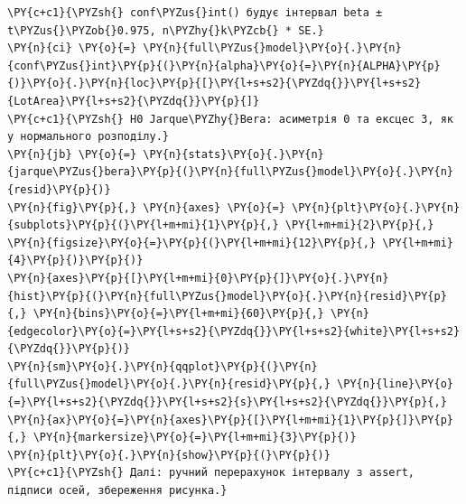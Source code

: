 \begin{Verbatim}[commandchars=\\\{\}]
\PY{c+c1}{\PYZsh{} conf\PYZus{}int() будує інтервал beta ± t\PYZus{}\PYZob{}0.975, n\PYZhy{}k\PYZcb{} * SE.}
\PY{n}{ci} \PY{o}{=} \PY{n}{full\PYZus{}model}\PY{o}{.}\PY{n}{conf\PYZus{}int}\PY{p}{(}\PY{n}{alpha}\PY{o}{=}\PY{n}{ALPHA}\PY{p}{)}\PY{o}{.}\PY{n}{loc}\PY{p}{[}\PY{l+s+s2}{\PYZdq{}}\PY{l+s+s2}{LotArea}\PY{l+s+s2}{\PYZdq{}}\PY{p}{]}
\PY{c+c1}{\PYZsh{} H0 Jarque\PYZhy{}Bera: асиметрія 0 та ексцес 3, як у нормального розподілу.}
\PY{n}{jb} \PY{o}{=} \PY{n}{stats}\PY{o}{.}\PY{n}{jarque\PYZus{}bera}\PY{p}{(}\PY{n}{full\PYZus{}model}\PY{o}{.}\PY{n}{resid}\PY{p}{)}
\PY{n}{fig}\PY{p}{,} \PY{n}{axes} \PY{o}{=} \PY{n}{plt}\PY{o}{.}\PY{n}{subplots}\PY{p}{(}\PY{l+m+mi}{1}\PY{p}{,} \PY{l+m+mi}{2}\PY{p}{,} \PY{n}{figsize}\PY{o}{=}\PY{p}{(}\PY{l+m+mi}{12}\PY{p}{,} \PY{l+m+mi}{4}\PY{p}{)}\PY{p}{)}
\PY{n}{axes}\PY{p}{[}\PY{l+m+mi}{0}\PY{p}{]}\PY{o}{.}\PY{n}{hist}\PY{p}{(}\PY{n}{full\PYZus{}model}\PY{o}{.}\PY{n}{resid}\PY{p}{,} \PY{n}{bins}\PY{o}{=}\PY{l+m+mi}{60}\PY{p}{,} \PY{n}{edgecolor}\PY{o}{=}\PY{l+s+s2}{\PYZdq{}}\PY{l+s+s2}{white}\PY{l+s+s2}{\PYZdq{}}\PY{p}{)}
\PY{n}{sm}\PY{o}{.}\PY{n}{qqplot}\PY{p}{(}\PY{n}{full\PYZus{}model}\PY{o}{.}\PY{n}{resid}\PY{p}{,} \PY{n}{line}\PY{o}{=}\PY{l+s+s2}{\PYZdq{}}\PY{l+s+s2}{s}\PY{l+s+s2}{\PYZdq{}}\PY{p}{,} \PY{n}{ax}\PY{o}{=}\PY{n}{axes}\PY{p}{[}\PY{l+m+mi}{1}\PY{p}{]}\PY{p}{,} \PY{n}{markersize}\PY{o}{=}\PY{l+m+mi}{3}\PY{p}{)}
\PY{n}{plt}\PY{o}{.}\PY{n}{show}\PY{p}{(}\PY{p}{)}
\PY{c+c1}{\PYZsh{} Далі: ручний перерахунок інтервалу з assert, підписи осей, збереження рисунка.}
\end{Verbatim}

